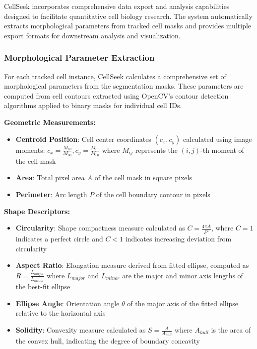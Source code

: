 \documentclass[../cellseek_paper.tex]{subfiles}
\begin{document}
CellSeek incorporates comprehensive data export and analysis capabilities designed to facilitate quantitative cell biology research. The system automatically extracts morphological parameters from tracked cell masks and provides multiple export formats for downstream analysis and visualization.

\subsubsection{Morphological Parameter Extraction}

For each tracked cell instance, CellSeek calculates a comprehensive set of morphological parameters from the segmentation masks. These parameters are computed from cell contours extracted using OpenCV's contour detection algorithms applied to binary masks for individual cell IDs.

\textbf{Geometric Measurements:}
\begin{itemize}
  \item \textbf{Centroid Position}: Cell center coordinates $(c_x, c_y)$ calculated using image moments: $c_x = \frac{M_{10}}{M_{00}}, c_y = \frac{M_{01}}{M_{00}}$ where $M_{ij}$ represents the $(i,j)$-th moment of the cell mask
  \item \textbf{Area}: Total pixel area $A$ of the cell mask in square pixels
  \item \textbf{Perimeter}: Arc length $P$ of the cell boundary contour in pixels
\end{itemize}

\textbf{Shape Descriptors:}
\begin{itemize}
  \item \textbf{Circularity}: Shape compactness measure calculated as $C = \frac{4\pi A}{P^2}$, where $C = 1$ indicates a perfect circle and $C < 1$ indicates increasing deviation from circularity
  \item \textbf{Aspect Ratio}: Elongation measure derived from fitted ellipse, computed as $R = \frac{L_{major}}{L_{minor}}$ where $L_{major}$ and $L_{minor}$ are the major and minor axis lengths of the best-fit ellipse
  \item \textbf{Ellipse Angle}: Orientation angle $\theta$ of the major axis of the fitted ellipse relative to the horizontal axis
  \item \textbf{Solidity}: Convexity measure calculated as $S = \frac{A}{A_{hull}}$ where $A_{hull}$ is the area of the convex hull, indicating the degree of boundary concavity
\end{itemize}
\end{document}
